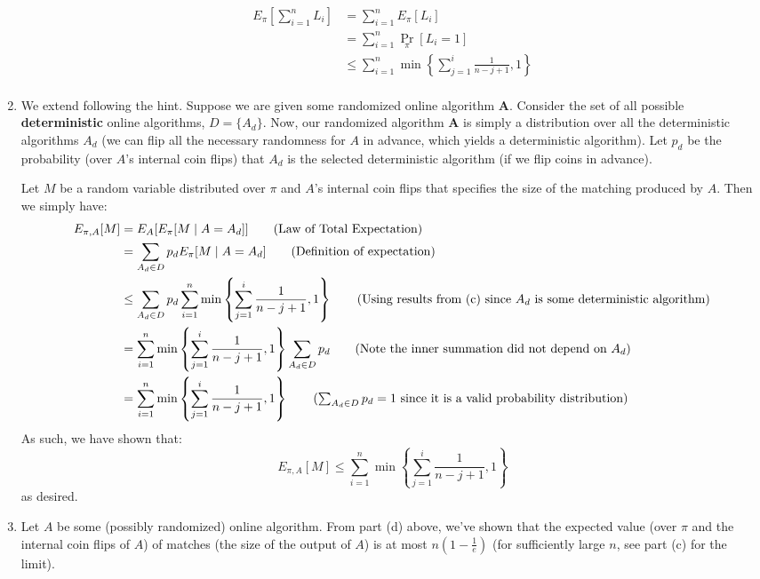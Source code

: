 \documentclass[12pt]{exam}
\begin{document}
\begin{questions}
\begin{solution}
\begin{enumerate}[label=(\alph*)]
      \begin{align*}
        E_{\pi}[\sum_{i=1}^n L_i] &= \sum_{i=1}^n E_{\pi}[L_i] \tag{Linearity of expectation} \\
        &= \sum_{i=1}^n \Pr_{\pi}[L_i = 1] \tag{Expectation of indicator variable} \\
        &\leq \sum_{i=1}^n \min\left\{ \sum_{j=1}^i \frac{1}{n-j+1}, 1 \right\} \tag{From results in (b)} \\
      \end{align*}
    \item
      We extend following the hint. Suppose we are given some randomized online algorithm $\textbf{A}$. Consider the set of all possible \textbf{deterministic} online algorithms, $D = \{A_d\}$. Now, our randomized algorithm $\textbf{A}$ is simply a distribution over all the deterministic algorithms $A_d$ (we can flip all the necessary randomness for $A$ in advance, which yields a deterministic algorithm). Let $p_d$ be the probability (over $A$'s internal coin flips) that $A_d$ is the selected deterministic algorithm (if we flip coins in advance).

      Let $M$ be a random variable distributed over $\pi$ and $A$'s internal coin flips that specifies the size of the matching produced by $A$. Then we simply have:
      \begin{align*}
        E_{\pi, A}[M] &= E_{A}[E_{\pi}[M \mid A = A_d]] \tag{Law of Total Expectation} \\
        &= \sum_{A_d \in D} p_d E_{\pi}[M \mid A = A_d] \tag{Definition of expectation} \\
        &\leq \sum_{A_d \in D} p_d \sum_{i=1}^n \min \left\{\sum_{j=1}^i \frac{1}{n-j+1}, 1 \right\} \tag{Using results from (c) since $A_d$ is some deterministic algorithm} \\
        &= \sum_{i=1}^n \min \left\{\sum_{j=1}^i \frac{1}{n-j+1}, 1 \right\} \sum_{A_d \in D} p_d \tag{Note the inner summation did not depend on $A_d$} \\
        &=\sum_{i=1}^n \min \left\{\sum_{j=1}^i \frac{1}{n-j+1}, 1 \right\} \tag{$\sum_{A_d \in D} p_d = 1$ since it is a valid probability distribution}
      \end{align*}
      As such, we have shown that:
      \[
        E_{\pi, A}[M] \leq \sum_{i=1}^n \min \left\{\sum_{j=1}^i \frac{1}{n-j+1}, 1 \right\}
      \]
      as desired.

    \item
      Let $A$ be some (possibly randomized) online algorithm. From part (d) above, we've shown that the expected value (over $\pi$ and the internal coin flips of $A$) of matches (the size of the output of $A$) is at most $n(1 - \frac{1}{e})$ (for sufficiently large $n$, see part (c) for the limit).


\end{enumerate}
\end{solution}
\end{questions}
\end{document}

